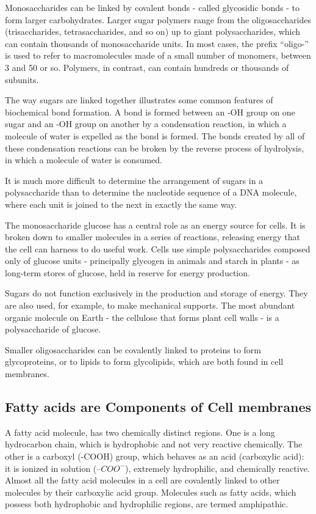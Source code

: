 Monosaccharides can be linked by covalent bonds - called glycosidic
bonds - to form larger carbohydrates.
Larger sugar polymers range from the oligosaccharides (trisaccharides, tetrasaccharides, and so on) up to giant
polysaccharides, which can contain thousands of monosaccharide units.
In most cases, the prefix “oligo-” is used to refer to macromolecules made
of a small number of monomers, between 3 and 50 or so. Polymers, in
contrast, can contain hundreds or thousands of subunits.

The way sugars are linked together illustrates some common features of
biochemical bond formation. A bond is formed between an -OH group
on one sugar and an -OH group on another by a condensation reaction, 
in which a molecule of water is expelled as the bond is formed.
The bonds created by all of these condensation reactions can
be broken by the reverse process of hydrolysis, in which a molecule of
water is consumed.

It is much more
difficult to determine the arrangement of sugars in a polysaccharide than
to determine the nucleotide sequence of a DNA molecule, where each
unit is joined to the next in exactly the same way.

The monosaccharide glucose has a central role as an energy source for
cells. It is broken down to smaller molecules in a series of reactions,
releasing energy that the cell can harness to do useful work.
Cells use simple polysaccharides composed only
of glucose units - principally glycogen in animals and starch in plants - as
long-term stores of glucose, held in reserve for energy production.

Sugars do not function exclusively in the production and storage of
energy. They are also used, for example, to make mechanical supports.
The most abundant organic molecule on Earth - the cellulose that forms
plant cell walls - is a polysaccharide of glucose.

Smaller oligosaccharides can be covalently linked to proteins to form
glycoproteins, or to lipids to form glycolipids, 
which are both found in cell membranes.

\subsection{Fatty acids are Components of Cell membranes}

A fatty acid molecule, has two
chemically distinct regions. One is a long hydrocarbon chain, which is
hydrophobic and not very reactive chemically. The other is a carboxyl
(-COOH) group, which behaves as an acid (carboxylic acid): it is ionized
in solution ($–COO^{-}$), extremely hydrophilic, and chemically reactive.
Almost all the fatty acid molecules in a cell are covalently linked to other
molecules by their carboxylic acid group.
Molecules such as fatty acids, which possess both hydrophobic and
hydrophilic regions, are termed amphipathic.

